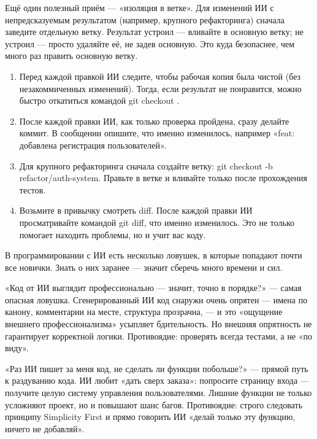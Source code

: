 Ещё один полезный приём — «изоляция в ветке». Для изменений ИИ с непредсказуемым результатом (например, крупного рефакторинга) сначала заведите отдельную ветку. Результат устроил — вливайте в основную ветку; не устроил — просто удаляйте её, не задев основную. Это куда безопаснее, чем много раз править основную ветку.

\begin{enumerate}
  \item Перед каждой правкой ИИ следите, чтобы рабочая копия была чистой (без незакоммиченных изменений). Тогда, если результат не понравится, можно быстро откатиться командой git checkout .
  \item После каждой правки ИИ, как только проверка пройдена, сразу делайте коммит. В сообщении опишите, что именно изменилось, например «feat: добавлена регистрация пользователей».
  \item Для крупного рефакторинга сначала создайте ветку: git checkout -b refactor/auth-system. Правьте в ветке и вливайте только после прохождения тестов.
  \item Возьмите в привычку смотреть diff. После каждой правки ИИ просматривайте командой git diff, что именно изменилось. Это не только помогает находить проблемы, но и учит вас коду.
\end{enumerate}


В программировании с ИИ есть несколько ловушек, в которые попадают почти все новички. Знать о них заранее — значит сберечь много времени и сил.


«Код от ИИ выглядит профессионально — значит, точно в порядке?» — самая опасная ловушка. Сгенерированный ИИ код снаружи очень опрятен — имена по канону, комментарии на месте, структура прозрачна, — и это «ощущение внешнего профессионализма» усыпляет бдительность. Но внешняя опрятность не гарантирует корректной логики. Противоядие: проверять всегда тестами, а не «по виду».


«Раз ИИ пишет за меня код, не сделать ли функции побольше?» — прямой путь к раздуванию кода. ИИ любит «дать сверх заказа»: попросите страницу входа — получите целую систему управления пользователями. Лишние функции не только усложняют проект, но и повышают шанс багов. Противоядие: строго следовать принципу Simplicity First и прямо говорить ИИ «делай только эту функцию, ничего не добавляй».

